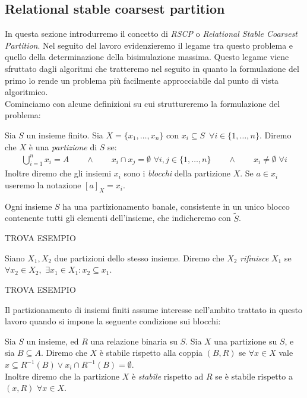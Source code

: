 \subsection{Relational stable coarsest partition}
\label{sec:rscp}
In questa sezione introdurremo il concetto di \emph{RSCP} o \emph{Relational Stable Coarsest Partition}. Nel seguito del lavoro evidenzieremo il legame tra questo problema e quello della determinazione della bisimulazione massima. Questo legame viene sfruttato dagli algoritmi che tratteremo nel seguito in quanto la formulazione del primo lo rende un problema più facilmente approcciabile dal punto di vista algoritmico.\\
Cominciamo con alcune definizioni su cui struttureremo la formulazione del problema:
\begin{definition}
    Sia $S$ un insieme finito. Sia $X = \{x_1, \dots, x_n\}$ con $x_i \subseteq S \,\,\,\forall i \in \{1,\dots,n\}$. Diremo che $X$ è una \emph{partizione} di $S$ se:
    \begin{gather*}
        \bigcup_{i = 1}^n x_i = A \qquad \land \qquad x_i \cap x_j = \emptyset \,\,\forall i,j \in \{1,\dots,n\} \qquad \land \qquad x_i \neq \emptyset \,\,\forall i
    \end{gather*}
    Inoltre diremo che gli insiemi $x_i$ sono i \emph{blocchi} della partizione $X$. Se $a \in x_i$ useremo la notazione $[a]_X = x_i$.
\end{definition}
\begin{observation}
    \label{obs:part_banale}
    Ogni insieme $S$ ha una partizionamento banale, consistente in un unico blocco contenente tutti gli elementi dell'insieme, che indicheremo con $\widetilde{S}$.
\end{observation}
\begin{example}
    TROVA ESEMPIO
    \label{exa:set_partition}
\end{example}
\begin{definition}
    Siano $X_1,X_2$ due partizioni dello stesso insieme. Diremo che $X_2$ \emph{rifinisce} $X_1$ se $\forall x_2 \in X_2, \,\,\exists x_1 \in X_1 : x_2 \subseteq x_1$.
\end{definition}
\begin{example}
    TROVA ESEMPIO
\end{example}
Il partizionamento di insiemi finiti assume interesse nell'ambito trattato in questo lavoro quando si impone la seguente condizione sui blocchi:
\begin{definition}
    Sia $S$ un insieme, ed $R$ una relazione binaria su $S$. Sia $X$ una partizione su $S$, e sia $B \subseteq A$. Diremo che $X$ è stabile rispetto alla coppia $(B,R)$ se $\forall x \in X$ vale $x \subseteq R^{-1}(B) \lor x_i \cap R^{-1}(B) = \emptyset$.\\
    Inoltre diremo che la partizione $X$ è \emph{stabile} rispetto ad $R$ se è stabile rispetto a $(x,R) \,\,\forall x \in X$.
\end{definition}
